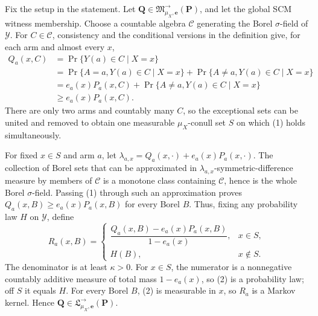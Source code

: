 Fix the setup in the statement.  Let \(\boldsymbol Q\in\mathfrak M^{\to}_{\mu_X,\boldsymbol e}(\boldsymbol P)\), and let the global SCM witness membership.  Choose a countable algebra \(\mathcal C\) generating the Borel \(\sigma\)-field of \(\mathcal Y\).  For \(C\in\mathcal C\), consistency and the conditional versions in the definition give, for each arm and almost every \(x\),
\[
\begin{aligned}
 Q_a(x,C)
 &=\Pr\{Y(a)\in C\mid X=x\}\\
 &=\Pr\{A=a,Y(a)\in C\mid X=x\}+\Pr\{A\ne a,Y(a)\in C\mid X=x\}\\
 &=e_a(x)P_a(x,C)+\Pr\{A\ne a,Y(a)\in C\mid X=x\}\\
 &\ge e_a(x)P_a(x,C).
\end{aligned}\tag{1}
\]
There are only two arms and countably many \(C\), so the exceptional sets can be united and removed to obtain one measurable \(\mu_X\)-conull set \(S\) on which (1) holds simultaneously.

For fixed \(x\in S\) and arm \(a\), let \(\lambda_{a,x}=Q_a(x,\cdot)+e_a(x)P_a(x,\cdot)\).  The collection of Borel sets that can be approximated in \(\lambda_{a,x}\)-symmetric-difference measure by members of \(\mathcal C\) is a monotone class containing \(\mathcal C\), hence is the whole Borel \(\sigma\)-field.  Passing (1) through such an approximation proves \(Q_a(x,B)\ge e_a(x)P_a(x,B)\) for every Borel \(B\).  Thus, fixing any probability law \(H\) on \(\mathcal Y\), define
\[
 R_a(x,B)=
 \begin{cases}
 \dfrac{Q_a(x,B)-e_a(x)P_a(x,B)}{1-e_a(x)},&x\in S,\\[6pt]
 H(B),&x\notin S.
 \end{cases} \tag{2}
\]
The denominator is at least \(\kappa>0\).  For \(x\in S\), the numerator is a nonnegative countably additive measure of total mass \(1-e_a(x)\), so (2) is a probability law; off \(S\) it equals \(H\).  For every Borel \(B\), (2) is measurable in \(x\), so \(R_a\) is a Markov kernel.  Hence \(\boldsymbol Q\in\mathfrak L^{\to}_{\mu_X,\boldsymbol e}(\boldsymbol P)\).

